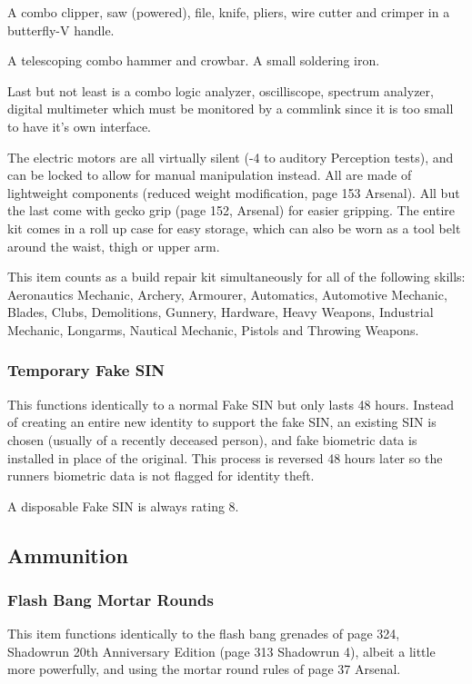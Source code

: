 \documentclass{article}
\begin{document}
  A combo clipper, saw (powered), file, knife, pliers, wire cutter and crimper in a butterfly-V handle.
  
  A telescoping combo hammer and crowbar.  A small soldering iron.  
  
  Last but not least is a combo logic analyzer, oscilliscope, spectrum analyzer, digital multimeter which must be monitored by a commlink since it is too small to have it's own interface.

  The electric motors are all virtually silent (-4 to auditory Perception tests), and can be locked to allow for manual manipulation instead.  All are made of lightweight components (reduced weight modification, page 153 Arsenal).  All but the last come with gecko grip (page 152, Arsenal) for easier gripping.  The entire kit comes in a roll up case for easy storage, which can also be worn as a tool belt around the waist, thigh or upper arm.

  This item counts as a build repair kit simultaneously for all of the following skills:  Aeronautics Mechanic, Archery, Armourer, Automatics, Automotive Mechanic, Blades, Clubs, Demolitions, Gunnery, Hardware, Heavy Weapons, Industrial Mechanic, Longarms, Nautical Mechanic, Pistols and Throwing Weapons.

\subsubsection*{Temporary Fake SIN}

This functions identically to a normal Fake SIN but only lasts 48 hours.  Instead of creating an entire new identity to support the fake SIN, an existing SIN is chosen (usually of a recently deceased person), and fake biometric data is installed in place of the original.  This process is reversed 48 hours later so the runners biometric data is not flagged for identity theft.

A disposable Fake SIN is always rating 8.

\subsection*{Ammunition}

\subsubsection*{Flash Bang Mortar Rounds}

 This item functions identically to the flash bang grenades of page 324, Shadowrun 20th Anniversary Edition (page 313 Shadowrun 4), albeit a little more powerfully, and using the mortar round rules of page 37 Arsenal. 
\end{document}
